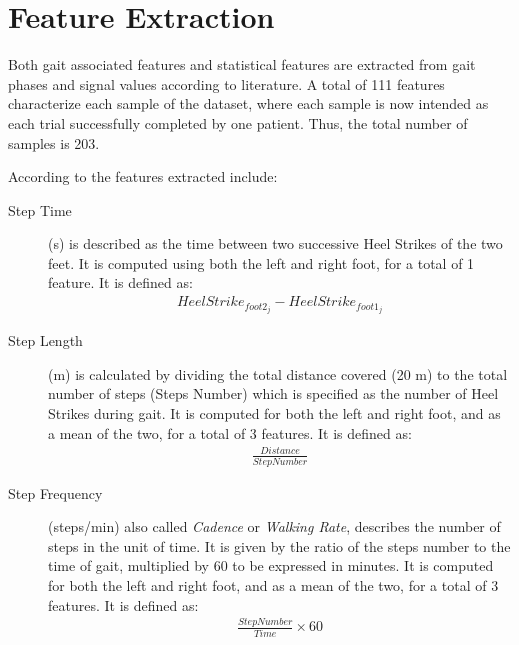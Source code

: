 \section{Feature Extraction}

Both gait associated features and statistical features are extracted from gait phases and signal values according to literature. A total of 111 features characterize each sample of the dataset, where each sample is now intended as each trial successfully completed by one patient. Thus, the total number of samples is 203.

According to \cite{TheSmartInsoleDataset} the features extracted include:
\begin{description}

\item[Step Time]
 (s) is described as the time between two successive Heel Strikes of the two feet. It is computed using both the left and right foot, for a total of 1 feature. It is defined as:
\begin{equation}
\begin{aligned}
HeelStrike_{foot2_j} - HeelStrike_{foot1_j}
\end{aligned}
\end{equation}

\item[Step Length] 
 (m) is calculated by dividing the total distance covered (20 m) to the total number of steps (Steps Number) which is specified as the number of Heel Strikes during gait. It is computed for both the left and right foot, and as a mean of the two, for a total of 3 features. It is defined as:
\begin{equation}
\begin{aligned}
\frac{Distance}{StepNumber}
\end{aligned}
\end{equation}


\item[Step Frequency] 
 (steps/min) also called \textit{Cadence} or \textit{Walking Rate}, describes the number of steps in the unit of time. It is given by the ratio of the steps number to the time of gait, multiplied by 60 to be expressed in minutes. It is computed for both the left and right foot, and as a mean of the two, for a total of 3 features. It is defined as:
\begin{equation}
\begin{aligned}
\frac{Step Number}{Time} \times 60
\end{aligned}
\end{equation}



\end{description}
